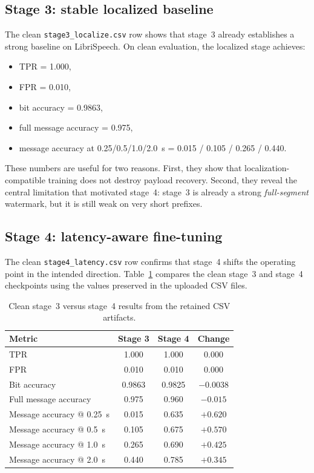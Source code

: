 \subsection{Stage 3: stable localized baseline}
The clean \texttt{stage3\_localize.csv} row shows that stage~3 already establishes a strong baseline on LibriSpeech. On clean evaluation, the localized stage achieves:
\begin{itemize}[leftmargin=1.25em]
  \item TPR = 1.000,
  \item FPR = 0.010,
  \item bit accuracy = 0.9863,
  \item full message accuracy = 0.975,
  \item message accuracy at 0.25/0.5/1.0/2.0~s = 0.015 / 0.105 / 0.265 / 0.440.
\end{itemize}
These numbers are useful for two reasons. First, they show that localization-compatible training does not destroy payload recovery. Second, they reveal the central limitation that motivated stage~4: stage~3 is already a strong \emph{full-segment} watermark, but it is still weak on very short prefixes.

\subsection{Stage 4: latency-aware fine-tuning}
The clean \texttt{stage4\_latency.csv} row confirms that stage~4 shifts the operating point in the intended direction. Table~\ref{tab:stage3_stage4_clean_exact} compares the clean stage~3 and stage~4 checkpoints using the values preserved in the uploaded CSV files.

\begin{table}[H]
\centering
\caption{Clean stage~3 versus stage~4 results from the retained CSV artifacts.}
\label{tab:stage3_stage4_clean_exact}
\begin{tabular}{lccc}
\toprule
\textbf{Metric} & \textbf{Stage 3} & \textbf{Stage 4} & \textbf{Change} \\
\midrule
TPR & 1.000 & 1.000 & 0.000 \\
FPR & 0.010 & 0.010 & 0.000 \\
Bit accuracy & 0.9863 & 0.9825 & $-0.0038$ \\
Full message accuracy & 0.975 & 0.960 & $-0.015$ \\
Message accuracy @ 0.25~s & 0.015 & 0.635 & $+0.620$ \\
Message accuracy @ 0.5~s  & 0.105 & 0.675 & $+0.570$ \\
Message accuracy @ 1.0~s  & 0.265 & 0.690 & $+0.425$ \\
Message accuracy @ 2.0~s  & 0.440 & 0.785 & $+0.345$ \\
\bottomrule
\end{tabular}
\end{table}

